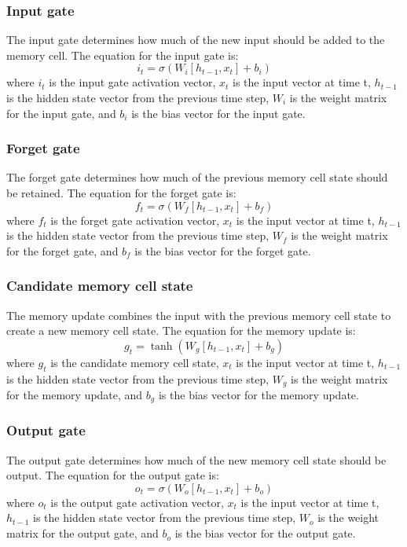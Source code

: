 \documentclass[a4paper, noexaminfo]{sapthesis}
\begin{document}
\subsubsection{Input gate}
The input gate determines how much of the new input should be added to the 
memory cell. The equation for the input gate is:
\begin{equation}
  i_t = \sigma(W_i [h_{t-1}, x_t] + b_i)
  \end{equation}
where $i_t$ is the input gate activation vector, $x_t$ is the input vector 
at time t, $h_{t-1}$ is the hidden state vector from the previous time 
step, $W_i$ is the weight matrix for the input gate, and $b_i$ is the bias 
vector for the input gate.
\subsubsection{Forget gate}
The forget gate determines how much of the previous memory cell state 
should be retained. The equation for the forget gate is:
\begin{equation}
  f_t = \sigma(W_f [h_{t-1}, x_t] + b_f)
  \end{equation}
where $f_t$ is the forget gate activation vector, $x_t$ is the input 
vector at time t, $h_{t-1}$ is the hidden state vector from the previous time
 step, $W_f$ is the weight matrix for the forget gate, and $b_f$ is the bias 
 vector for the forget gate.
\subsubsection{Candidate memory cell state}
The memory update combines the input with the previous memory cell
 state to create a new memory cell state. The equation for the
  memory update is:
  \begin{equation}
    g_t = \tanh(W_g [h_{t-1}, x_t] + b_g)
    \end{equation}
where $g_t$ is the candidate memory cell state, $x_t$ is the input vector 
at time t, $h_{t-1}$ is the hidden state vector from the previous time step,
 $W_g$ is the weight matrix for the memory update, and $b_g$ is the bias vector
  for the memory update.
\subsubsection{Output gate}
The output gate determines how much of the new memory cell state should be 
output. The equation for the output gate is:
\begin{equation}
  o_t = \sigma(W_o [h_{t-1}, x_t] + b_o)
  \end{equation}
where $o_t$ is the output gate activation vector, $x_t$ is the input vector
 at time t, $h_{t-1}$ is the hidden state vector from the previous time step,
  $W_o$ is the weight matrix for the output gate, and $b_o$ is the bias vector 
  for the output gate.
\end{document}

